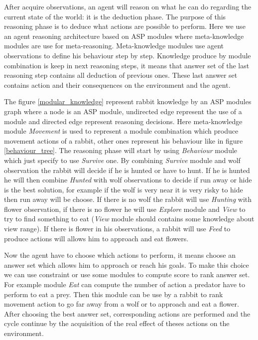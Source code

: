 \documentclass{aamas2012}
\begin{document}
	After acquire observations, an agent will reason on what he can do regarding the current state of the world: it is the deduction phase.
	The purpose of this reasoning phase is to deduce what actions are possible to perform.
	Here we use an agent reasoning architecture based on ASP modules where meta-knowledge modules are use for meta-reasoning.
	Meta-knowledge modules use agent observations to define his behaviour step by step.
	Knowledge produce by module combination is keep in next reasoning steps, 
	it means that answer set of the last reasoning step contains all deduction of previous ones.
	These last answer set contains action and their consequences on the environment and the agent.
	
	The figure \ref{modular_knowledge} represent rabbit knowledge by an ASP modules graph where a node is an ASP module, 
	undirected edge represent the use of a module and directed edge represent reasoning decisions.
	Here meta-knowledge module \textit{Movement} is used to represent a module combination which produce movement actions of a rabbit,
	other ones represent his behaviour like in figure \ref{behaviour_tree}.
	The reasoning phase will start by using \textit{Behaviour} module which just specify to use \textit{Survive} one.
	By combining \textit{Survive} module and wolf observation the rabbit will decide if he is hunted or have to hunt.
	If he is hunted he will then combine \textit{Hunted} with wolf observations to decide if run away or hide is the best solution,
	for example if the wolf is very near it is very risky to hide then run away will be choose.
	If there is no wolf the rabbit will use \textit{Hunting} with flower observation, if there is no flower he will use \textit{Explore} module
	and \textit{View} to try to find something to eat (\textit{View} module should contains some knowledge about view range).
	If there is flower in his observations, a rabbit will use \textit{Feed} to produce actions will allows him to approach and eat flowers.
	
	Now the agent have to choose which actions to perform, it means choose an answer set which allows him to approach or reach his goals.
	To make this choice we can use constraint or use some modules to compute score to rank answer set.
	For example module \textit{Eat} can compute the number of action a predator have to perform to eat a prey.
	Then this module can be use by a rabbit to rank movement action to go far away from a wolf or to approach and eat a flower.
	After choosing the best answer set, corresponding actions are performed and 
	the cycle continue by the acquisition of the real effect of theses actions on the environment.
\end{document}
